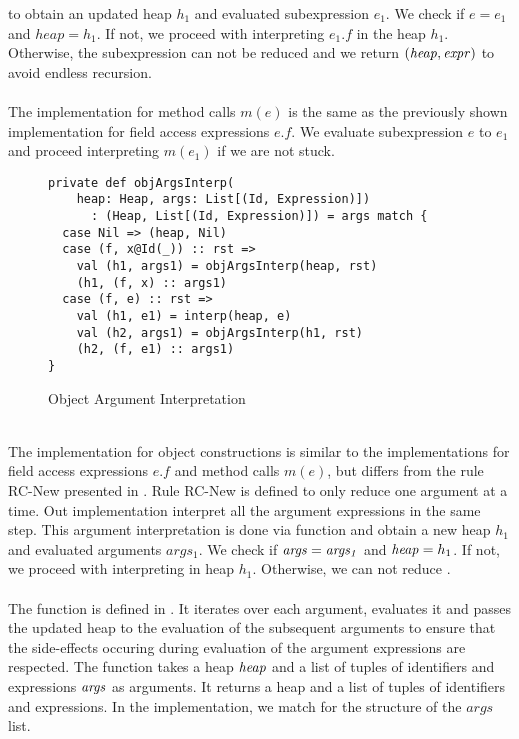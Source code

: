 to obtain an updated heap $h_1$ and evaluated subexpression $e_1$.
We check if $e = e_1$ and $heap = h_1$.
If not, we proceed with interpreting $e_1.f$ in the heap $h_1$.
Otherwise, the subexpression can not be reduced
and we return $(\mathit{heap}, \mathit{expr})$ to avoid endless recursion.\\
\\
The implementation for method calls $m(e)$ is the same
as the previously shown implementation for field access expressions $e.f$.
We evaluate subexpression $e$ to $e_1$ and proceed
interpreting $m(e_1)$ if we are not stuck.
%
\begin{figure}[h]
\begin{lstlisting}
private def objArgsInterp(
    heap: Heap, args: List[(Id, Expression)])
      : (Heap, List[(Id, Expression)]) = args match {
  case Nil => (heap, Nil)
  case (f, x@Id(_)) :: rst =>
    val (h1, args1) = objArgsInterp(heap, rst)
    (h1, (f, x) :: args1)
  case (f, e) :: rst =>
    val (h1, e1) = interp(heap, e)
    val (h2, args1) = objArgsInterp(h1, rst)
    (h2, (f, e1) :: args1)
}
\end{lstlisting}
\caption{Object Argument Interpretation}
\label{fig:scala-objArgsInterp}
\end{figure}\\
%
The implementation for object constructions 
is similar to the implementations for field access expressions $e.f$
and method calls $m(e)$,
but differs from the rule RC-New presented in .
Rule RC-New is defined to only reduce one argument at a time.
Out implementation interpret all the argument expressions in the same step.
This argument interpretation is done via function 
and obtain a new heap $h_1$ and evaluated arguments $args_1$.
We check if $\mathit{args} = \mathit{args_1}$ and $\mathit{heap} = h_1$.
If not, we proceed with interpreting  in heap $h_1$.
Otherwise, we can not reduce .\\
\\
The function  is defined in .
It iterates over each argument, evaluates it
and passes the updated heap to the evaluation of the subsequent arguments
to ensure that the side-effects occuring during evaluation
of the argument expressions are respected.
The function takes a heap $\mathit{heap}$ and a list of tuples of
identifiers and expressions $\mathit{args}$ as arguments.
It returns a heap and a list of tuples of identifiers and expressions.
In the implementation, we match for the structure of the $args$ list.

